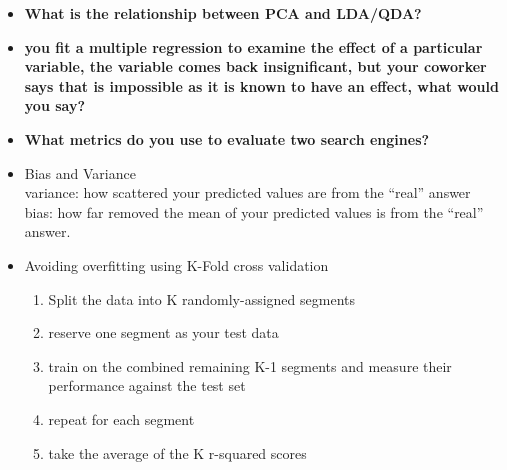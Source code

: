 \documentclass{article}
\begin{document}
\begin{itemize}
\item \textbf{What is the relationship between PCA and LDA/QDA?}\\

\item \textbf{you fit a multiple regression to examine the effect of a particular variable, the variable comes back insignificant, but your coworker says that is impossible as it is known to have an effect, what would you say?}\\

\item \textbf{What metrics do you use to evaluate two search engines?}
\end{itemize}


\begin{itemize}
\item Bias and Variance\\
variance: how scattered your predicted values are from the ``real'' answer\\
bias: how far removed the mean of your predicted values is from the ``real'' answer.
\item Avoiding overfitting using K-Fold cross validation\\
\begin{enumerate}
\item Split the data into K randomly-assigned segments
\item reserve one segment as your test data
\item train on the combined remaining K-1 segments and measure their performance against the test set
\item repeat for each segment
\item take the average of the K r-squared scores
\end{enumerate}

\end{itemize}
\end{document}
